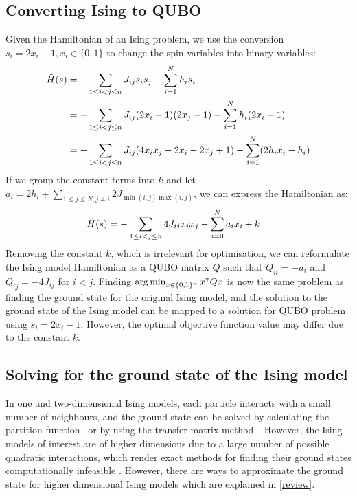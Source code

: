 \subsection{Converting Ising to QUBO}\label{isingtoqubo}
Given the Hamiltonian of an Ising problem, we use the conversion $s_i = 2x_i - 1, x_i \in \{0, 1\}$ to change the spin variables into binary variables:
\begin{align}
    \Hat{H}(s) &= -\sum_{1\leq i < j \leq n} J_{ij}s_i s_j - \sum_{i=1}^N h_i s_i \nonumber\\
    &= -\sum_{1\leq i < j \leq n} J_{ij}(2x_i - 1) (2x_j - 1) - \sum_{i=1}^N h_i (2x_i - 1) \nonumber\\
    &= -\sum_{1\leq i < j \leq n} J_{ij}(4x_i x_j - 2x_i - 2x_j + 1) - \sum_{i=1}^N (2h_i x_i - h_i) \nonumber
\end{align}
If we group the constant terms into $k$ and let $a_i = 2h_i + \sum_{1\leq j \leq N, j \neq i} 2J_{\min(i,j)\max(i,j)}$, we can express the Hamiltonian as:
\begin{align}
    \Hat{H}(s) &= -\sum_{1\leq i < j \leq n} 4J_{ij}x_i x_j - \sum_{i=0}^N a_{i}x_i + k \nonumber
\end{align}
Removing the constant $k$, which is irrelevant for optimisation, we can reformulate the Ising model Hamiltonian as a QUBO matrix $Q$ such that $Q_{ii} = -a_i$ and $Q_{ij} = -4J_{ij}$ for $i < j$. Finding $\operatorname*{arg\,min}_{x \in \{0, 1\}^n} x^\intercal Q x$ is now the same problem as finding the ground state for the original Ising model, and the solution to the ground state of the Ising model can be mapped to a solution for QUBO problem using $s_i = 2x_i - 1$. However, the optimal objective function value may differ due to the constant $k$.

\subsection{Solving for the ground state of the Ising model}
In one and two-dimensional Ising models, each particle interacts with a small number of neighbours, and the ground state can be solved by calculating the partition function~\cite{onsager} or by using the transfer matrix method~\cite{kramerising}. However, the Ising models of interest are of higher dimensions due to a large number of possible quadratic interactions, which render exact methods for finding their ground states computationally infeasible \cite{barahona1982computational}. However, there are ways to approximate the ground state for higher dimensional Ising models which are explained in \autoref{review}.

